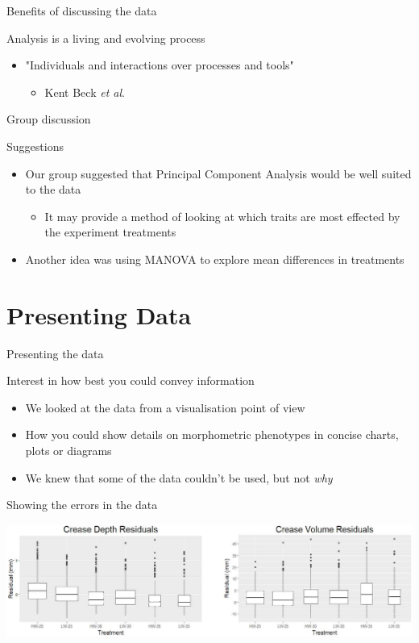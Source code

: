 \documentclass[t, aspectratio=169]{beamer}
\begin{document}
\begin{frame}[label={sec:orgc9d53ed}]{Benefits of discussing the data}
\begin{block}{Analysis is a living and evolving process}
\begin{itemize}
\item "Individuals and interactions over processes and tools"
\begin{itemize}
\item Kent Beck \emph{et al}.
\end{itemize}
\end{itemize}
\end{block}
\end{frame}

\begin{frame}[label={sec:org976f079}]{Group discussion}
\begin{block}{Suggestions}
\begin{itemize}
\item Our group suggested that Principal Component Analysis would be well suited to the data
\begin{itemize}
\item It may provide a method of looking at which traits are most effected by the experiment treatments
\end{itemize}
\item Another idea was using MANOVA to explore mean differences in treatments
\end{itemize}
\end{block}
\end{frame}


\section{Presenting Data}
\label{sec:org0d2ebad}
\begin{frame}[label={sec:org30b408d}]{Presenting the data}
\begin{block}{Interest in how best you could convey information}
\begin{itemize}
\item We looked at the data from a visualisation point of view
\item How you could show details on morphometric phenotypes in concise charts, plots or diagrams
\item We knew that some of the data couldn't be used, but not \emph{why}
\end{itemize}
\end{block}
\end{frame}
\begin{frame}[label={sec:org6db41f6}]{Showing the errors in the data}
\begin{center}
\includegraphics[width=14cm]{./peter.png}
\end{center}
\end{frame}
\end{document}
